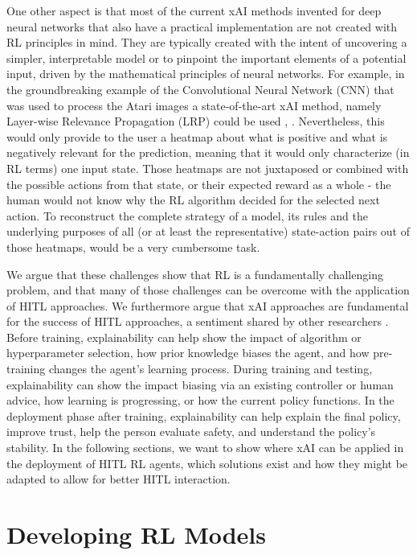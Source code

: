 \documentclass[twoside,11pt]{article}
\begin{document}
One other aspect is that most of the current xAI methods invented for deep neural networks that also have a practical implementation are not created with RL principles in mind. They are typically created with the intent of uncovering a simpler, interpretable model or to pinpoint the important elements of a potential input, driven by the mathematical principles of neural networks. For example, in the groundbreaking example of the Convolutional Neural Network (CNN) that was used to process the Atari images \cite{Mnih:2013:PlayingAtariDeepRL} a state-of-the-art xAI method, namely Layer-wise Relevance Propagation (LRP) could be used \cite{Bach:2015:LayerWiseRelevancePropagation}, \cite{Alber:2019:Innvestigate}. Nevertheless, this would only provide to the user a heatmap about what is positive and what is negatively relevant for the prediction, meaning that it would only characterize (in RL terms) one input state. Those heatmaps are not juxtaposed or combined with the possible actions from that state, or their expected reward as a whole - the human would not know why the RL algorithm decided for the selected next action. To reconstruct the complete strategy of a model, its rules and the underlying purposes of all (or at least the representative) state-action pairs out of those heatmaps, would be a very cumbersome task. 

We argue that these challenges show that RL is a fundamentally challenging problem, and that many of those challenges can be overcome with the application of HITL approaches. We furthermore argue that xAI approaches are fundamental for the success of HITL approaches, a sentiment shared by other researchers \citep{heuillet2021explainability}. Before training, explainability can help show the impact of algorithm or hyperparameter selection, how prior knowledge biases the agent, and how pre-training changes the agent's learning process. During training and testing, explainability can show the impact biasing via an existing controller or human advice, how learning is progressing, or how the current policy functions. In the deployment phase after training, explainability can help explain the final policy, improve trust, help the person evaluate safety, and understand the policy's stability. In the following sections, we want to show where xAI can be applied in the deployment of HITL RL agents, which solutions exist and how they might be adapted to allow for better HITL interaction.
\section{Developing RL Models}
\end{document}

